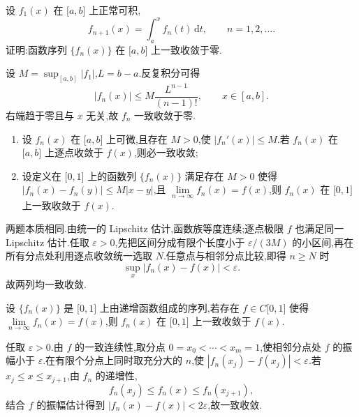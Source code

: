 \begin{example}
    设 $f_1(x)$ 在 $\lbrack a,b\rbrack$ 上正常可积,
    \[
        f_{n+1}(x)=\int_a^x f_n(t)\,\mathrm{d}t,
        \qquad n=1,2,\ldots.
    \]
    证明:函数序列 $\{f_n(x)\}$ 在 $\lbrack a,b\rbrack$ 上一致收敛于零.
\end{example}
\exampleblank

\begin{solution}
    设 $M=\sup_{[a,b]}|f_1|$,$L=b-a$.反复积分可得
    \[
        |f_n(x)|\leq M\dfrac{L^{n-1}}{(n-1)!},
        \qquad x\in[a,b].
    \]
    右端趋于零且与 $x$ 无关,故 $f_n$ 一致收敛于零.
\end{solution}

\begin{example}
    \begin{enumerate}
        \item 设 $f_n(x)$ 在 $\lbrack a,b\rbrack$ 上可微,且存在 $M>0$,使 $|f_n'(x)|\leq M$.若 $f_n(x)$ 在 $\lbrack a,b\rbrack$ 上逐点收敛于 $f(x)$,则必一致收敛;
        \item 设定义在 $\lbrack 0,1\rbrack$ 上的函数列 $\{f_n(x)\}$ 满足存在 $M>0$ 使得
              $|f_n(x)-f_n(y)|\leq M|x-y|$,且 $\displaystyle\lim\limits_{n\to\infty}f_n(x)=f(x)$,则 $f_n(x)$ 在 $\lbrack 0,1\rbrack$ 上一致收敛于 $f(x)$.
    \end{enumerate}
\end{example}
\exampleblank

\begin{solution}
    两题本质相同.由统一的 Lipschitz 估计,函数族等度连续;逐点极限 $f$ 也满足同一 Lipschitz 估计.任取 $\varepsilon>0$,先把区间分成有限个长度小于 $\varepsilon/(3M)$ 的小区间,再在所有分点处利用逐点收敛统一选取 $N$.任意点与相邻分点比较,即得 $n\geq N$ 时
    \[
        \sup_x|f_n(x)-f(x)|<\varepsilon.
    \]
    故两列均一致收敛.
\end{solution}

\begin{example}
    设 $\{f_n(x)\}$ 是 $\lbrack 0,1\rbrack$ 上由递增函数组成的序列,若存在 $f\in C\lbrack 0,1\rbrack$ 使得 $\displaystyle\lim\limits_{n\to\infty}f_n(x)=f(x)$,则 $f_n(x)$ 在 $\lbrack 0,1\rbrack$ 上一致收敛于 $f(x)$.
\end{example}
\exampleblank

\begin{solution}
    任取 $\varepsilon>0$.由 $f$ 的一致连续性,取分点
    $0=x_0<\cdots<x_m=1$,使相邻分点处 $f$ 的振幅小于 $\varepsilon$.在有限个分点上同时取充分大的 $n$,使
    $|f_n(x_j)-f(x_j)|<\varepsilon$.若 $x_j\leq x\leq x_{j+1}$,由
    $f_n$ 的递增性,
    \[
        f_n(x_j)\leq f_n(x)\leq f_n(x_{j+1}),
    \]
    结合 $f$ 的振幅估计得到 $|f_n(x)-f(x)|<2\varepsilon$,故一致收敛.
\end{solution}

